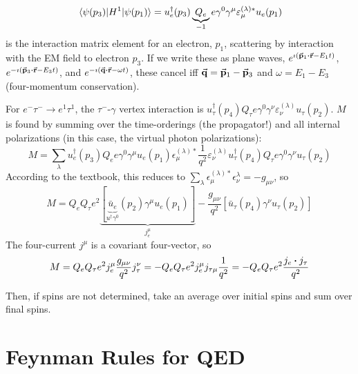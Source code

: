 \documentclass[a4paper,twoside,master.tex]{subfiles}
\begin{document}
\begin{equation}
    \mel{\psi(p_3)}{H^1}{\psi(p_1)} = u_e^\dagger(p_3) \underbrace{Q_e}_{-1} e \gamma^0 \gamma^{\mu} \varepsilon_{\mu}^{(\lambda)*} u_e(p_1)
\end{equation}
is the interaction matrix element for an electron, $ p_1 $, scattering by interaction with the EM field to electron $ p_3 $. If we write these as plane waves, $ e^{\imath (\va{p}_1 \vdot \va{r} - E_1 t)} $, $ e^{- \imath (\va{p}_3 \vdot \va{r} - E_3 t)} $, and $ e^{- \imath (\va{q} \vdot \va{r} - \omega t)} $, these cancel iff $ \va{q} = \va{p}_1 - \va{p}_3 $ and $ \omega = E_1 - E_3 $ (four-momentum conservation).

For $ e^- \tau^- \to e^1 \tau^1 $, the $ \tau^- $-$ \gamma $ vertex interaction is $ u_{\tau}^\dagger(p_4) Q_{\tau} e \gamma^0 \gamma^{\nu} \varepsilon_{\nu}^{(\lambda)} u_{\tau}(p_2) $. $ M $ is found by summing over the time-orderings (the propagator!) and all internal polarizations (in this case, the virtual photon polarizations):
\begin{equation}
    M = \sum_{\lambda} u_e^\dagger(p_3) Q_e e \gamma^0 \gamma^{\mu} u_e(p_1) \epsilon_{\mu}^{(\lambda)*} \frac{1}{q^2} \varepsilon_{\nu}^{(\lambda)} u_{\tau}^\dagger(p_4) Q_{\tau} e \gamma^{0} \gamma^{\nu} u_{\tau}(p_2)
\end{equation}
According to the textbook, this reduces to $ \sum_{\lambda} \epsilon_{\mu}^{(\lambda)*} \epsilon_{\nu}^{\lambda} = -g_{\mu \nu} $, so
\begin{equation}
    M = Q_e Q_{\tau} e^2 \underbrace{\left[ \underbrace{\bar{u}_e}_{u^\dagger \gamma^0}(p_2) \gamma^{\mu} u_e(p_1) \right]}_{j^{\mu}_e} - \frac{g_{\mu \nu}}{q^2} \left[ \bar{u}_{\tau}(p_4) \gamma^{\nu} u_{\tau}(p_2) \right]
\end{equation}
The four-current $ j^{\mu} $ is a covariant four-vector, so
\begin{equation}
    M = Q_e Q_{\tau} e^2 j^{\mu}_e \frac{g_{\mu \nu}}{q^2} j^{\nu}_{\tau} = - Q_e Q_{\tau} e^2 j_e^{\mu} j_{\tau \mu} \frac{1}{q^2} = -Q_e Q_{\tau} e^2 \frac{j_e \vdot j_{\tau}}{q^2}
\end{equation}

Then, if spins are not determined, take an average over initial spins and sum over final spins.

\section{Feynman Rules for QED}\label{sec:feynman_rules_for_qed}
\end{document}
